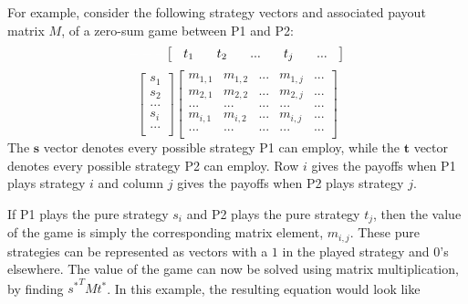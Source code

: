 \documentclass[11pt]{article}
\begin{document}
For example, consider the following strategy vectors and associated
payout matrix $M$, of a zero-sum game between P1 and P2:
\begin{equation*}
\setlength\arraycolsep{9pt}
\textcolor{white}{+++}\left[ {\begin{array}{ccccc}
t_1 & t_2 & ... & t_j & ... \\
\end{array} } \right]
\end{equation*}
\begin{equation*}
\left[ {\begin{array}{c}
s_1 \\
s_2 \\
... \\
s_i \\
... \\
\end{array} } \right]
\left[ {\begin{array}{ccccc}
m_{1,1} & m_{1,2}   & ... & m_{1,j} & ... \\
m_{2,1} & m_{2,2}   & ... & m_{2,j} & ... \\
...    & ...      & ... & ...    & ... \\
m_{i,1} & m_{i,2}   & ... & m_{i,j} & ... \\
...    & ...      & ... & ...    & ... \\
\end{array} } \right]
\end{equation*}
The $\mathbf{s}$ vector denotes every possible strategy P1 can employ,
while the $\mathbf{t}$ vector denotes every possible strategy P2 can
employ. Row $i$ gives the payoffs when P1 plays strategy $i$ and column
$j$ gives the payoffs when P2 plays strategy $j$.

If P1 plays the pure strategy $s_i$ and P2 plays the pure strategy
$t_j$, then the value of the game is simply the corresponding matrix
element, $m_{i,j}$. These pure strategies can be represented as
vectors with a $1$ in the played strategy and $0$'s elsewhere. The
value of the game can now be solved using matrix multiplication, by
finding ${s^*}^T M t^*$. In this example, the resulting equation would
look like
\end{document}
